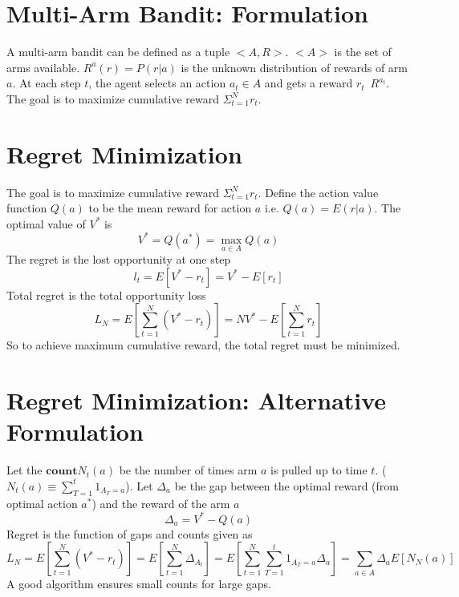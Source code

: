 \documentclass{article}
\begin{document}
\section{Multi-Arm Bandit: Formulation}
A multi-arm bandit can be defined as a tuple $<A, R>$. $<A>$ is the set of arms available. $R^a(r)=P(r|a)$ is the unknown distribution of rewards of arm $a$. At each step $t$, the agent selects an action $a_t \in A$ and gets a reward $r_t $~$ R^{a_t}$. The goal is to maximize cumulative reward $\Sigma_{t=1}^{N} r_t$.
\section{Regret Minimization}
The goal is to maximize cumulative reward $\Sigma_{t=1}^{N} r_t$. Define the action value function $Q(a)$ to be the mean reward for action $a$ i.e. $Q(a) = E(r|a)$. The optimal value of $V^{*}$ is
\begin{equation} \label{eu_eqn}
V^* = Q(a^*) = \max_{a \in A} Q(a)
\end{equation}
The regret is the lost opportunity at one step
\begin{equation} \label{eu_eqn}
l_{t}=E[V^{*}-r_{t}]=V^{*}-E[r_{t}]
\end{equation}
Total regret is the total opportunity loss
\begin{equation} \label{eu_eqn}
L_{N}=E[\sum_{t=1}^{N}(V^{*}-r_{t})]=NV^{*}-E[\sum_{t=1}^{N}r_{t}]
\end{equation}
So to achieve maximum cumulative reward, the total regret must be minimized.
\section{Regret Minimization: Alternative Formulation}
Let the $\textbf{count} N_{t}(a)$ be the number of times arm $a$ is pulled up to time $t$. ($N_{t}(a)\equiv\sum_{T=1}^{t}1_{A_{T}=a}$). Let $\Delta_{a}$ be the gap between the optimal reward (from optimal action $a^{*}$) and the reward of the arm $a$
\begin{equation} \label{eu_eqn}
\Delta_{a}=V^{*}-Q(a)
\end{equation}
Regret is the function of gaps and counts given as
\begin{equation} \label{eu_eqn}
L_{N}=E[\sum_{t=1}^{N}(V^{*}-r_{t})]=E[\sum_{t=1}^{N}\Delta_{A_{t}}]=E[\sum_{t=1}^{N}\sum_{T=1}^{t}1_{A_{T}=a}\Delta_{a}]=\sum_{a \in A}\Delta_{a}E[N_{N}(a)]
\end{equation}
A good algorithm ensures small counts for large gaps.
\end{document}
